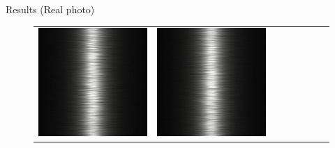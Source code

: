\documentclass[final]{beamer}
\newlength{\twocolwid}
\newlength{\resultwidth}
\begin{document}
\begin{frame}[t]
\begin{columns}[t]
\begin{column}{\twocolwid}
\begin{block}{Results (Real photo)}
\begin{figure}[t]
\begin{tabular}{ccrclccc}
            		\includegraphics[width=\resultwidth]{real/metal/good2.jpg} &
            		\includegraphics[width=\resultwidth]{real/metal/good3.jpg} &

\end{tabular}
\end{figure}
\end{block}
\end{column}
\end{columns}
\end{frame}
\end{document}
